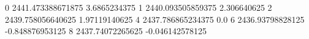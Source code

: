 0 2441.473388671875 3.6865234375
1 2440.093505859375 2.306640625
2 2439.758056640625 1.97119140625
4 2437.786865234375 0.0
6 2436.93798828125 -0.848876953125
8 2437.74072265625 -0.046142578125
